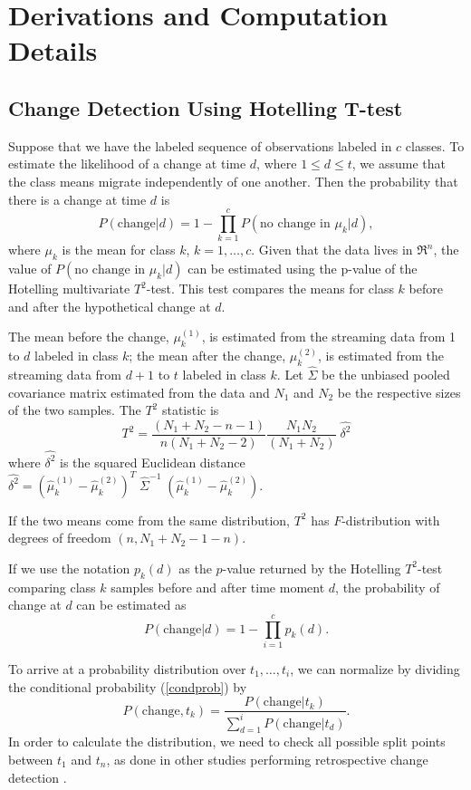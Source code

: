 \chapter{Derivations and Computation Details}
\label{cha:derivations}

\section{Change Detection Using Hotelling T-test}
\label{sec:hotelling}

Suppose that we have the labeled sequence of observations labeled in $c$ classes. To estimate the likelihood of a change at time $d$, where $1\leq d\leq t$, we assume that the class means migrate independently of one another. Then the probability that there is a change at time $d$ is
\[
P(\mbox{change}|d) = 1 - \prod_{k=1}^cP(\mbox{no change in }\mu_k|d),
\]
where $\mu_k$ is the mean for class $k$, $k=1,\ldots,c$. Given that the data lives in $\Re^n$, the value of $P(\mbox{no change in }\mu_k|d)$ can be estimated using the p-value of the Hotelling multivariate $T^2$-test. This test compares the means for class $k$ before and after the hypothetical change at $d$.

The mean before the change, $\mu_k^{(1)}$, is estimated from the streaming data from 1 to $d$ labeled in class $k$; the mean after the change, $\mu_k^{(2)}$, is estimated from the streaming data from $d+1$ to $t$ labeled in class $k$. Let $\hat\Sigma$ be the unbiased pooled covariance matrix estimated from the data and $N_1$ and $N_2$ be the respective sizes of the two samples. The $T^2$ statistic is
\begin{equation}
T^2 = \frac{(N_1 + N_2 - n - 1)}{n(N_1 + N_2 - 2)} \frac{N_1N_2}{(N_1 + N_2)} \;\hat{\delta^2}
\end{equation}
where $\hat{\delta^2}$ is the squared Euclidean distance
$\hat{\delta^2}=\left(\hat \mu_k^{(1)}- \hat \mu_k^{(2)}\right)^T \;\hat\Sigma^{-1}\;
\left(\hat \mu_k^{(1)}- \hat \mu_k^{(2)}\right).$

If the two means come from the same distribution, $T^2$ has $F$-distribution with degrees of freedom $(n, N_1+N_2-1-n)$.

If we use the notation $p_k(d)$ as the $p$-value returned by the Hotelling $T^2$-test comparing class $k$ samples before and after time moment $d$, the probability of change at $d$ can be estimated as
\begin{equation}
P(\mbox{change}|d) = 1 - \prod_{i=1}^cp_k(d).
\end{equation}

To arrive at a probability distribution  over $t_1,\ldots,t_i$, we can normalize by dividing the conditional probability (\ref{condprob}) by
\begin{equation}
P(\mbox{change},t_k) = \frac{P(\mbox{change}|t_k)}{\sum_{d=1}^i P(\mbox{change}|t_d)}.
\end{equation}
\enlargethispage{2\baselineskip}
In order to calculate the distribution, we need to check all possible split points between $t_1$ and $t_n$, as done in other studies performing retrospective change detection \cite{Kifer04,Bifet07,Adams07}.
